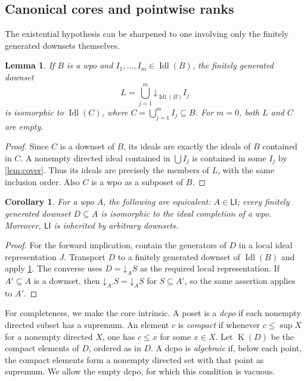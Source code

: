 \documentclass[11pt,letterpaper]{article}
\theoremstyle{teal}
\newtheorem{lemma}[theorem]{Lemma}
\newtheorem{corollary}[theorem]{Corollary}
\theoremstyle{definition}
\newcommand{\Idl}{\operatorname{Idl}}
\newcommand{\Comp}{\operatorname{K}}
\newcommand{\LI}{\mathsf{LI}}
\newcommand{\dn}{\mathord\downarrow}
\begin{document}
\subsection{Canonical cores and pointwise ranks}
The existential hypothesis can be sharpened to one involving only the finitely generated downsets themselves.

\begin{lemma}\label{lem:fgwindow}
If $B$ is a wpo and $I_1,\ldots,I_m\in\Idl(B)$, the finitely generated downset
\[
 L=\bigcup_{j=1}^m\dn_{\Idl(B)} I_j
\]
is isomorphic to $\Idl(C)$, where $C=\bigcup_{j=1}^m I_j\subseteq B$. For $m=0$, both $L$ and $C$ are empty.
\end{lemma}
\begin{proof}
Since $C$ is a downset of $B$, its ideals are exactly the ideals of $B$ contained in $C$. A nonempty directed ideal contained in $\bigcup I_j$ is contained in some $I_j$ by \cref{lem:cover}. Thus its ideals are precisely the members of $L$, with the same inclusion order. Also $C$ is a wpo as a subposet of $B$.
\end{proof}

\begin{corollary}\label{cor:fg-equivalence}
For a wpo $A$, the following are equivalent: $A\in\LI$; every finitely generated downset $D\subseteq A$ is isomorphic to the ideal completion of a wpo. Moreover, $\LI$ is inherited by arbitrary downsets.
\end{corollary}
\begin{proof}
For the forward implication, contain the generators of $D$ in a local ideal representation $J$. Transport $D$ to a finitely generated downset of $\Idl(B)$ and apply \cref{lem:fgwindow}. The converse uses $D=\dn_A S$ as the required local representation. If $A'\subseteq A$ is a downset, then $\dn_{A'}S=\dn_A S$ for $S\subseteq A'$, so the same assertion applies to $A'$.
\end{proof}

For completeness, we make the core intrinsic. A poset is a \emph{dcpo} if each nonempty directed subset has a supremum. An element $c$ is \emph{compact} if whenever $c\leq\sup X$ for a nonempty directed $X$, one has $c\leq x$ for some $x\in X$. Let $\Comp(D)$ be the compact elements of $D$, ordered as in $D$. A dcpo is \emph{algebraic} if, below each point, the compact elements form a nonempty directed set with that point as supremum. We allow the empty dcpo, for which this condition is vacuous.
\end{document}
